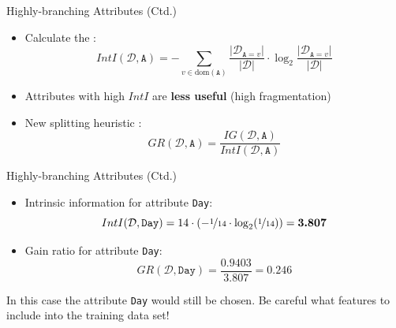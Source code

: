 \begin{frame}{Highly-branching Attributes (Ctd.)}{}
	\begin{itemize}
		\item Calculate the :
		\begin{equation}
			IntI(\mathcal{D}, \texttt{A})
				= -\sum_{v \in \text{dom}(\texttt{A})} \frac{\vert \mathcal{D}_{\texttt{A}=v} \vert}{\vert \mathcal{D} \vert} \cdot
					\log_2 \frac{\vert \mathcal{D}_{\texttt{A}=v} \vert}{\vert \mathcal{D} \vert}
		\end{equation}
		\item Attributes with high $IntI$ are \textbf{less useful} (high fragmentation)
		\item New splitting heuristic :
		\begin{equation}
			GR(\mathcal{D}, \texttt{A}) = \frac{IG(\mathcal{D}, \texttt{A})}{IntI(\mathcal{D}, \texttt{A})}
		\end{equation}
	\end{itemize}
\end{frame}


\begin{frame}{Highly-branching Attributes (Ctd.)}{}
	\begin{itemize}
		\item Intrinsic information for attribute \texttt{Day}:
		\begin{equation}
			IntI(\mathcal{D}, \texttt{Day}) = 14 \cdot (-\nicefrac{1}{14} \cdot \log_2 (\nicefrac{1}{14})) = \bm{3.807}
		\end{equation}
		\item Gain ratio for attribute \texttt{Day}:
		\begin{equation}
			GR(\mathcal{D}, \texttt{Day}) = \frac{0.9403}{3.807} = \bm{0.246}
		\end{equation}
	\end{itemize}

	\vspace*{-3mm}
	\begin{boxBlue}
		\footnotesize
		In this case the attribute \texttt{Day} would still be chosen.
		Be careful what features to include into the training data set! 
	\end{boxBlue}
\end{frame}


